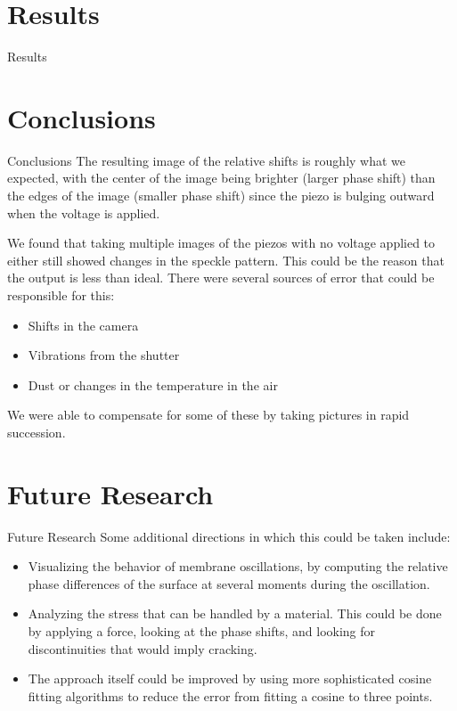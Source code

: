 \documentclass[pdf]{beamer}
\begin{document}
\section{Results}
\begin{frame}{Results}

\end{frame}

\section{Conclusions}
\begin{frame}{Conclusions}
The resulting image of the relative shifts is roughly what we expected, with the center of the image being brighter (larger phase shift) than the edges of the image (smaller phase shift) since the piezo is bulging outward when the voltage is applied.

\vspace{0.3cm}
We found that taking multiple images of the piezos with no voltage applied to either still showed changes in the speckle pattern. This could be the reason that the output is less than ideal. There were several sources of error that could be responsible for this:
\begin{itemize}
	\item Shifts in the camera
	\item Vibrations from the shutter
	\item Dust or changes in the temperature in the air
\end{itemize}
We were able to compensate for some of these by taking pictures in rapid succession.
\end{frame}

\section{Future Research}
\begin{frame}{Future Research}
Some additional directions in which this could be taken include:
\begin{itemize}
\item{Visualizing the behavior of membrane oscillations, by computing the relative phase differences of the surface at several moments during the oscillation.}
\item{Analyzing the stress that can be handled by a material. This could be done by applying a force, looking at the phase shifts, and looking for discontinuities that would imply cracking.}
\item{The approach itself could be improved by using more sophisticated cosine fitting algorithms to reduce the error from fitting a cosine to three points.}
\end{itemize}
\end{frame}
\end{document}
